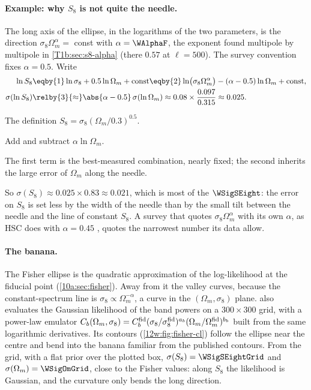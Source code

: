 \paragraph{Example: why $S_8$ is not quite the needle.} The long axis of the ellipse, in the logarithms of the two
parameters, is the direction $\sigma_8\Omega_m^\alpha=$ const with $\alpha=\WAlphaF$, the exponent found multipole by
multipole in \cref{T1b:sec:s8-alpha} (there $0.57$ at $\ell=500$). The survey convention fixes $\alpha=0.5$. Write
\begin{align}
\ln S_8
&\eqby{1}\ln\sigma_8+0.5\ln\Omega_m+\text{const}
\eqby{2}\ln\bigl(\sigma_8\Omega_m^{\alpha}\bigr)-(\alpha-0.5)\ln\Omega_m+\text{const},
\nonumber\\
\sigma(\ln S_8)
&\relby{3}{\approx}\abs{\alpha-0.5}\,\sigma(\ln\Omega_m)
\approx0.08\times\frac{0.097}{0.315}\approx0.025 .
\label{12w:eq:s8-tilt}
\end{align}
\begin{explain}
  \item The definition $S_8=\sigma_8(\Omega_m/0.3)^{0.5}$.
  \item Add and subtract $\alpha\ln\Omega_m$.
  \item The first term is the best-measured combination, nearly fixed; the second inherits the large error of
        $\Omega_m$ along the needle.
\end{explain}
So $\sigma(S_8)\approx0.025\times0.83\approx0.021$, which is most of the $\WSigSEight$: the error on $S_8$ is set less
by the width of the needle than by the small tilt between the needle and the line of constant $S_8$. A survey that
quotes $\sigma_8\Omega_m^\alpha$ with its own $\alpha$, as HSC does with $\alpha=0.45$ \cite{Hikage2019HSC}, quotes the
narrowest number its data allow.

\paragraph{The banana.} The Fisher ellipse is the quadratic approximation of the log-likelihood at the fiducial
point (\cref{10a:sec:fisher}). Away from it the valley curves, because the constant-spectrum line is
$\sigma_8\propto\Omega_m^{-\alpha}$, a curve in the $(\Omega_m,\sigma_8)$ plane.  also
evaluates the Gaussian likelihood of the band powers on a $300\times300$ grid, with a power-law emulator
$C_b(\Omega_m,\sigma_8)=C_b^{\rm fid}(\sigma_8/\sigma_8^{\rm fid})^{a_b}(\Omega_m/\Omega_m^{\rm fid})^{b_b}$ built from the same
logarithmic derivatives. Its contours (\cref{12w:fig:fisher-cl}) follow the ellipse near the centre and bend into
the banana familiar from the published contours. From the grid, with a flat prior over the plotted box,
$\sigma(S_8)=\WSigSEightGrid$ and $\sigma(\Omega_m)=\WSigOmGrid$, close to the Fisher values: along $S_8$ the
likelihood is Gaussian, and the curvature only bends the long direction.

